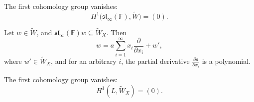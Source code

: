 \documentclass[10pt,a4paper]{amsart}
\begin{document}
	\begin{Lemma}\label{Lemma6} The first cohomology group vanishes: $$H^1\big(\mathfrak{sl}_{\infty}(\mathbb{F}), \widetilde{W}\big) = (0).$$ \end{Lemma}

	\begin{Lemma}\label{Lemma7} Let $w \in \widetilde{W}$, and $\mathfrak{sl}_\infty(\mathbb{F}) w \subseteq \widetilde{W}_X$. Then
		\[
		w = a \sum_{i=1}^{\infty} x_i \frac{\partial}{\partial x_i} + w',
		\]
		where $w' \in \widetilde{W}_X$, and for an arbitrary $i$, the partial derivative $\frac{\partial a}{\partial x_i}$ is a polynomial. \end{Lemma}

	\begin{Lemma}\label{Lemma8} The first cohomology group vanishes: $$H^1(L, \widetilde{W}_X) = (0).$$ \end{Lemma}
\end{document}
